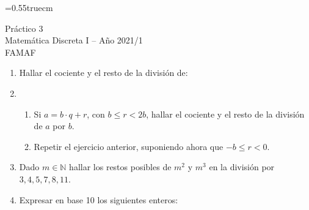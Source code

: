 \documentclass[a4paper,12pt,twoside,spanish,reqno]{amsbook}
\numberwithin{equation}{section}
\begin{document}
    \baselineskip=0.55truecm %
    

  {\bf \begin{center}\large  Práctico 3 \\ Matemática Discreta I -- Año 2021/1 \\ FAMAF \end{center}}



\begin{enumerate}
\setlength\itemsep{1.1em}


\item Hallar el cociente y el resto de la división de:
\



\item 
\begin{enumerate}
  \item Si $a=b\cdot q+r$, con $b \le r <2 b$, hallar el cociente y el resto de la división de $a$ por $b$.
  \item Repetir el ejercicio anterior, suponiendo ahora que $-b \le r < 0$.
\end{enumerate}


\item Dado $m\in \mathbb N$ hallar los restos posibles de $m^2$ y $m^3$ en la división por $3,4,5,7,8, 11$.

\item Expresar en base 10 los siguientes enteros:


\end{enumerate}
\end{document}
